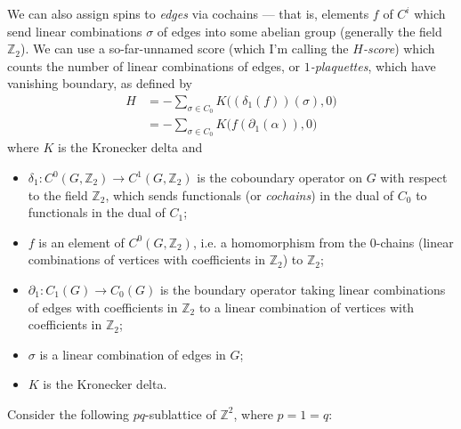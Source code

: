 \documentclass[11pt]{article}
\theoremstyle{definition}
\newcommand{\Z}{\mathbb{Z}}			%
\begin{document}
		We can also assign spins to \textit{edges} via cochains --- that is, elements $f$ of $C^i$ which send linear combinations $\sigma$ of edges into some abelian group (generally the field $\Z_2$). We can use a so-far-unnamed score (which I'm calling the \textit{$H$-score}) which counts the number of linear combinations of edges, or \textit{$1$-plaquettes}, which have vanishing boundary, as defined by
		\begin{align*}
			H &= -\sum_{\sigma \in C_0} K \bigg((\delta_1(f))(\sigma), 0\bigg) \\
			&= -\sum_{\sigma \in C_0} K\bigg(f(\partial_1(\alpha)), 0\bigg)
		\end{align*}
	 	where $K$ is the Kronecker delta and
	 	\begin{itemize}[topsep=0pt,label=$\triangleright$]
	 		\item $\delta_1: C^0(G, \Z_2) \to C^1(G, \Z_2)$ is the coboundary operator on $G$ with respect to the field $\Z_2$, which sends functionals (or \textit{cochains}) in the dual of $C_0$ to functionals in the dual of $C_1$;
	 		\item $f$ is an element of $C^0(G, \Z_2)$, i.e. a homomorphism from the $0$-chains (linear combinations of vertices with coefficients in $\Z_2$) to $\Z_2$;
	 		\item $\partial_1: C_1(G) \to C_0(G)$ is the boundary operator taking linear combinations of edges with coefficients in $\Z_2$ to a linear combination of vertices with coefficients in $\Z_2$;
	 		\item $\sigma$ is a linear combination of edges in $G$;
	 		\item $K$ is the Kronecker delta.
	 	\end{itemize}
	 	
	 	Consider the following $pq$-sublattice of $\Z^2$, where $p = 1 = q$:
	 	
	 	\begin{figure*}[htpb!]
	 		\centering
	 	\end{figure*}
	 	
\end{document}
